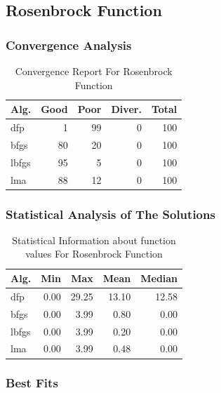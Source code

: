 \documentclass[conference]{IEEEtran}
\begin{document}
\subsection{Rosenbrock Function}
\label{rosenbrock30d30D}

\subsubsection{Convergence Analysis}
\label{convergencerosenbrock30d30D}

\begin{table}[H]
\centering
\caption{Convergence Report For Rosenbrock Function}
\label{convergence:rosenbrock30d}
\begin{tabular}{lrrrr}
\toprule
 Alg. &  Good &  Poor &  Diver. &  Total \\
\midrule
  dfp &     1 &    99 &       0 &    100 \\
 bfgs &    80 &    20 &       0 &    100 \\
lbfgs &    95 &     5 &       0 &    100 \\
  lma &    88 &    12 &       0 &    100 \\
\bottomrule
\end{tabular}
\end{table}

\subsubsection{Statistical Analysis of The Solutions}
\label{statisticalanalysisrosenbrock30d30D}

\begin{table}[H]
\centering
\caption{Statistical Information about function values For Rosenbrock Function}
\label{function_values:rosenbrock30d}
\begin{tabular}{lrrrr}
\toprule
 Alg. &  Min &   Max &  Mean &  Median \\
\midrule
  dfp & 0.00 & 29.25 & 13.10 &   12.58 \\
 bfgs & 0.00 &  3.99 &  0.80 &    0.00 \\
lbfgs & 0.00 &  3.99 &  0.20 &    0.00 \\
  lma & 0.00 &  3.99 &  0.48 &    0.00 \\
\bottomrule
\end{tabular}
\end{table}

\subsubsection{Best Fits}
\label{bestfitsrosenbrock30d30D}
\end{document}
